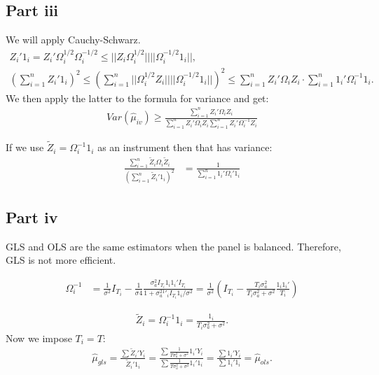 \documentclass[11pt]{article} %
\begin{document}
\subsection{Part iii}
We will apply Cauchy-Schwarz. 
\begin{align*}
Z_{i}'1_i = Z_i'\Omega_i^{1/2}\Omega_i^{-1/2}\leq ||Z_i\Omega_i^{1/2}|| ||\Omega_i^{-1/2}1_i ||,\\
\left( \sum_{i=1}^n Z_i'1_i \right)^2 \leq \left( \sum_{i=1}^n ||\Omega_i^{1/2}Z_i||||\Omega_i^{-1/2}1_i|| \right)^2 \leq \sum_{i=1}^n Z_i'\Omega_i Z_i \cdot \sum_{i=1}^n 1_i'\Omega_i^{-1}1_i.
\end{align*}
We then apply the latter to the formula for variance and get:
\begin{align*}
Var(\hat{\mu}_{iv}) \geq \frac{\sum_{i=1}^nZ_i'\Omega_iZ_i}{\sum_{i=1}^nZ_i'\Omega_iZ_i \sum_{i=1}^nZ_i'\Omega_i^{-1}Z_i}
\end{align*}

If we use $\tilde{Z}_i = \Omega_i^{-1}1_i$ as an instrument then that has variance:
\begin{align*}
\frac{\sum_{i=1}^{n}\tilde{Z}_i\Omega_i\tilde{Z}_i}{(\sum_{i=1}^n \tilde{Z}_i'1_i)^2} &= \frac{1}{\sum_{i=1}^n 1_i'\Omega_i'1_i}
\end{align*}
\subsection{Part iv}
GLS and OLS are the same estimators when the panel is balanced. Therefore, GLS is not more efficient.

\begin{align*}
\Omega_i^{-1} &= \frac{1}{\sigma^2}I_{T_i} - \frac{1}{\sigma4}\frac{\sigma^2_aI_{T_i}1_i1_i'I_{T_i}}{1+\sigma_a^21'_iI_{T_i}1_i/\sigma^2} = \frac{1}{\sigma^2}\left( I_{T_i} - \frac{T_i\sigma^2_{a}}{T_i\sigma^2_a + \sigma^2}\frac{1_i1_i'}{T_i} \right)
\end{align*}

\begin{align*}
\tilde{Z}_i = \Omega_i^{-1}1_i = \frac{1_i}{T_i\sigma_a^2 + \sigma^2}.
\end{align*}
Now we impose $T_i = T$:
\begin{align*}
\hat{\mu}_{gls} = \frac{\sum \tilde{Z}_i'Y_i}{\tilde{Z}_i'1_i} = \frac{\sum \frac{1}{T\sigma_a^2 + \sigma^2}1_i'Y_i}{\sum \frac{1}{T\sigma_a^2 + \sigma^2}1_i'1_i} =  \frac{\sum 1_i'Y_i}{\sum1_i'1_i} = \hat{\mu}_{ols}.
\end{align*}
\end{document}
